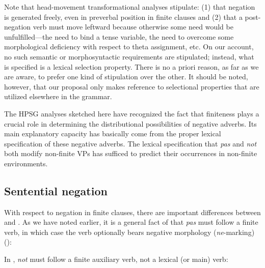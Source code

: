 \documentclass[output=paper
 	        ,biblatex
                ,babelshorthands
                ,newtxmath
                ,draftmode
                ,colorlinks, citecolor=brown
]{langscibook}
\begin{document}
\begin{exe}
\begin{xlist}
\begin{exe}
\begin{xlist}
Note that head-movement transformational analyses stipulate: (1) that negation
is generated freely, even in preverbal position in finite clauses and (2) that
a post-negation verb must move leftward because otherwise some need would be
unfulfilled---the need to bind a tense variable, the need to overcome some
morphological deficiency with respect to theta assignment, etc. On our
account, no such semantic or morphosyntactic requirements are stipulated;
instead, what is specified is a lexical selection property. There is no a
priori reason, as far as we are aware, to prefer one kind of stipulation over
the other. It should be noted, however, that our proposal only makes reference
to selectional properties that are utilized elsewhere in the grammar.
\fi


The HPSG analyses sketched here have recognized
the fact that finiteness plays a crucial role in
determining the distributional possibilities of negative
adverbs. Its main explanatory capacity
has basically come from the proper lexical specification of these negative
adverbs. The lexical specification that \textit{pas} and
\textit{not} both modify non-finite VPs has sufficed to predict their
occurrences in non-finite environments.



\subsection{Sentential negation}
\label{sec-sentential-negation}

With respect to negation in finite clauses, there are important differences between  and .
As we have noted earlier, it is a general fact of  that \textit{pas} must follow a finite verb, in which case the verb optionally bears negative morphology (\textit{ne}-marking) (\citealp[]{KS:02}):

\eal
{}
\zl
\noindent
In , \textit{not} must follow a finite
auxiliary verb, not a lexical (or main) verb:


\end{xlist}
\end{exe}
\end{xlist}
\end{exe}
\end{document}
